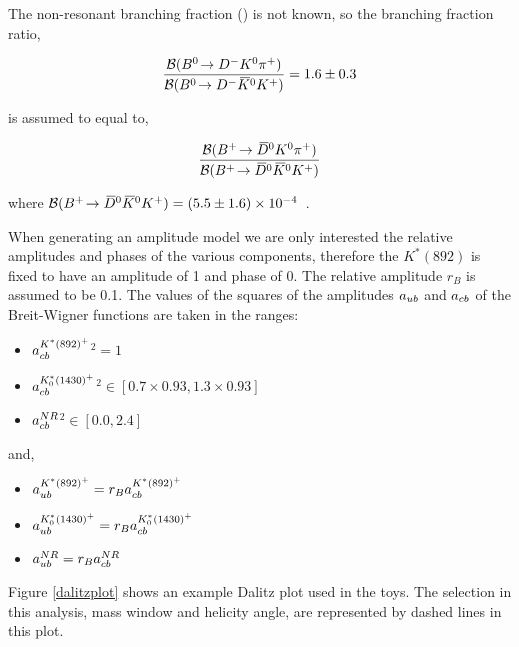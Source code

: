 The non-resonant branching fraction \BR(\decay{\Bp}{\Dzb\KS\pip}) is not known, so the branching fraction ratio,

\begin{equation*}
\frac{{\mathcal{B}}({{B}^0}\!\rightarrow {\ensuremath{{D}^-}}{\ensuremath{{K}^0}}{\ensuremath{{\pi}^+}})}{{\mathcal{B}}({{B}^0}\!\rightarrow {\ensuremath{{D}^-}}{\ensuremath{{\kern 0.2em\overline{\kern -0.2em K}{}}{}^0}}{\ensuremath{{K}^+}})} = 1.6 \pm 0.3
\end{equation*}

is assumed to equal to,

\begin{equation*}
\frac{{\mathcal{B}}({{{B}^+}}\!\rightarrow {\ensuremath{{\kern 0.2em\overline{\kern -0.2em D}{}}{}^0}}{\ensuremath{{K}^0}}{\ensuremath{{\pi}^+}})}{{\mathcal{B}}({{{B}^+}}\!\rightarrow {\ensuremath{{\kern 0.2em\overline{\kern -0.2em D}{}}{}^0}}{\ensuremath{{\kern 0.2em\overline{\kern -0.2em K}{}}{}^0}}{\ensuremath{{K}^+}})}
\end{equation*}

where ${\mathcal{B}}({{{B}^+}}\!\rightarrow {\ensuremath{{\kern 0.2em\overline{\kern -0.2em D}{}}{}^0}}{\ensuremath{{\kern 0.2em\overline{\kern -0.2em K}{}}{}^0}}{\ensuremath{{K}^+}}) = (5.5 \pm 1.6) \times 10^{-4}$~\cite{PDG2014}.

When generating an amplitude model we are only interested the relative amplitudes and phases of the various components, therefore the $K^*(892)$ is fixed to have an amplitude of 1 and phase of 0. The relative amplitude $r_B$ is assumed to be 0.1. The values of the squares of the amplitudes $a_{{u}{b}}$ and $a_{{c}{b}}$ of the Breit-Wigner functions are taken in the ranges:

\begin{itemize}
\item \textbar $a_{{c}{b}}^{K^*(892)^+}$\textbar$^2 = 1$
\item \textbar $a_{{c}{b}}^{K^*_0(1430)^+}$\textbar$^2 \in [0.7 \times 0.93,1.3 \times 0.93]$
\item \textbar $a_{{c}{b}}^{NR}$\textbar$^2 \in [0.0,2.4]$
\end{itemize}

and,

\begin{itemize}
\item $a_{{u}{b}}^{K^*(892)^+} = r_B a_{{c}{b}}^{K^*(892)^+}$
\item $a_{{u}{b}}^{K^*_0(1430)^+} = r_B a_{{c}{b}}^{K^*_0(1430)^+}$
\item $a_{{u}{b}}^{NR} = r_B a_{{c}{b}}^{NR}$
\end{itemize}

Figure \ref{dalitzplot} shows an example Dalitz plot used in the toys. The \Kstar selection in this analysis, \Kstar mass window and \KS helicity angle, are represented by dashed lines in this plot.

